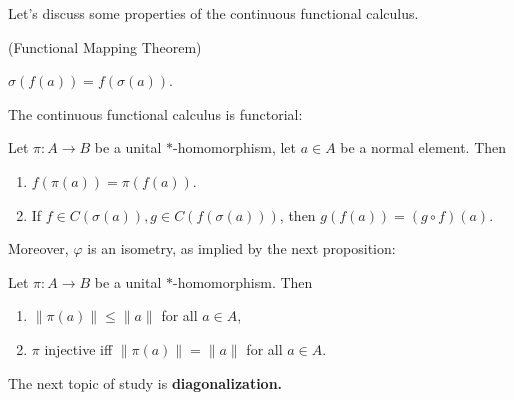 Let's discuss some properties of the continuous functional calculus.

\begin{corollary}(Functional Mapping Theorem)

	\label{cor:ContSpectralMapping}
	$\sigma(f(a)) = f(\sigma(a))$.
\end{corollary}

The continuous functional calculus is functorial:
\begin{proposition}
	\label{prop:ContFunctorial}
	 Let  $\pi:A \to B$ be a unital $*$-homomorphism, let $a \in A$ be a normal element. Then
	\begin{enumerate}
		\item $f(\pi(a)) = \pi(f(a))$.
		\item If $f \in C(\sigma(a)), g \in C(f(\sigma(a)))$, then $g(f(a)) = (g \circ f) (a)$.
	\end{enumerate}
\end{proposition}
Moreover, $\varphi$ is an isometry, as implied by the next proposition:
\begin{proposition}
	\label{prop:StarHomoIsometry}
	Let $\pi: A \to B$ be a unital $*$-homomorphism. Then
	\begin{enumerate}
		\item $\|\pi(a)\| \le  \|a\|$ for all $a \in A$,
		\item $\pi$ injective iff $\|\pi(a)\| = \|a\|$ for all $a \in A$.
	\end{enumerate}
\end{proposition}



The next topic of study is \textbf{diagonalization.}












